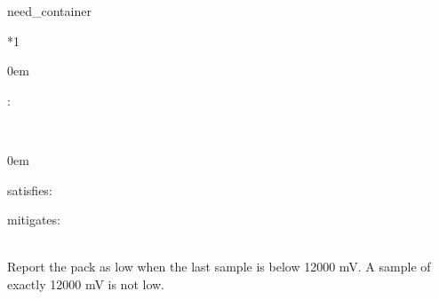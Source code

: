 \documentclass[a4paper,10pt,english]{sphinxmanual}
\begin{document}
\begin{sphinxuseclass}{need_container}

\begin{savenotes}\sphinxattablestart
\sphinxthistablewithglobalstyle
\centering
{}\label{\detokenize{requirements/specifications:SPEC_LOW_THRESHOLD}}\nobreak
\begin{tabular}[t]{*{1}{}}
\sphinxtoprule
\sphinxtableatstartofbodyhook
\begin{DUlineblock}{0em}
\item[] :  
\end{DUlineblock}
\\
\sphinxhline
\begin{DUlineblock}{0em}
\item[] 
\item[] 
\item[] 
\item[] 
\item[] 
\item[] 
\item[] \item[] satisfies: 
\item[] mitigates: 

\end{DUlineblock}
\\
\sphinxhline
\sphinxAtStartPar
Report the pack as low when the last sample is below 12000 mV.
A sample of exactly 12000 mV is not low.
\\
\sphinxbottomrule
\end{tabular}
\sphinxtableafterendhook\par
\sphinxattableend\end{savenotes}

\end{sphinxuseclass}
\end{document}

